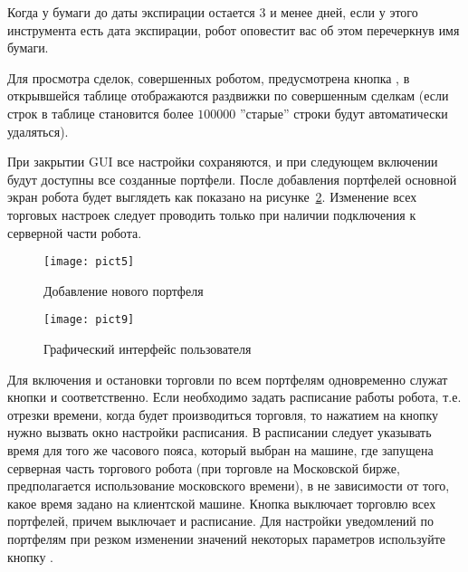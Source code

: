 Когда у бумаги до даты экспирации остается 3 и менее дней, если у этого инструмента есть дата экспирации, робот оповестит вас об этом перечеркнув имя бумаги.

Для просмотра сделок, совершенных роботом, предусмотрена кнопка , в открывшейся таблице отображаются раздвижки по совершенным сделкам
(если строк в таблице становится более $100000$ ''старые'' строки будут автоматически удаляться).

При закрытии GUI все настройки сохраняются, и при следующем включении будут доступны все созданные портфели. После добавления портфелей основной экран робота будет выглядеть
как показано на рисунке~\ref{fig:gui_portfolio}. Изменение всех торговых настроек следует проводить только при наличии подключения к серверной части робота.

\begin{figure}[h!]
\centering
\texttt{[image: pict5]}
\caption{Добавление нового портфеля}
\label{fig:add_portfolio}
\end{figure}
\begin{figure}[h!]
\centering
\texttt{[image: pict9]}
\caption{Графический интерфейс пользователя}
\label{fig:gui_portfolio}
\end{figure}

Для включения и остановки торговли по всем портфелям одновременно служат кнопки  и 
соответственно. Если необходимо задать расписание работы робота, т.е. отрезки времени, когда будет производиться торговля, то нажатием на кнопку
 нужно вызвать окно настройки расписания. В расписании следует указывать время для того же часового пояса, который выбран на машине,
где запущена серверная часть торгового робота (при торговле на Московской бирже, предполагается использование московского времени), в не зависимости от того, какое время
задано на клиентской машине. Кнопка  выключает торговлю всех портфелей, причем выключает и расписание.
Для настройки уведомлений по портфелям при резком изменении значений некоторых параметров используйте кнопку .

